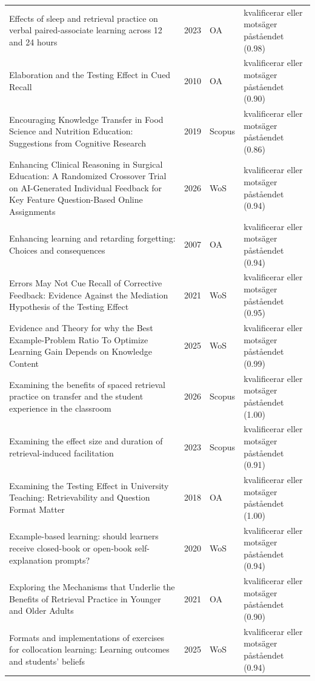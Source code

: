 \begin{longtable}{@{}%
  >{\raggedright\arraybackslash}p{}c%
  >{\raggedright\arraybackslash}p{}%
  >{\raggedright\arraybackslash}p{}@{}}
Effects of sleep and retrieval practice on verbal paired-associate learning across 12 and 24 hours & 2023 & OA & kvalificerar eller motsäger påståendet (0.98) \\
Elaboration and the Testing Effect in Cued Recall & 2010 & OA & kvalificerar eller motsäger påståendet (0.90) \\
Encouraging Knowledge Transfer in Food Science and Nutrition Education: Suggestions from Cognitive Research & 2019 & Scopus & kvalificerar eller motsäger påståendet (0.86) \\
Enhancing Clinical Reasoning in Surgical Education: A Randomized Crossover Trial on AI-Generated Individual Feedback for Key Feature Question-Based Online Assignments & 2026 & WoS & kvalificerar eller motsäger påståendet (0.94) \\
Enhancing learning and retarding forgetting: Choices and consequences & 2007 & OA & kvalificerar eller motsäger påståendet (0.94) \\
Errors May Not Cue Recall of Corrective Feedback: Evidence Against the Mediation Hypothesis of the Testing Effect & 2021 & WoS & kvalificerar eller motsäger påståendet (0.95) \\
Evidence and Theory for why the Best Example-Problem Ratio To Optimize Learning Gain Depends on Knowledge Content & 2025 & WoS & kvalificerar eller motsäger påståendet (0.99) \\
Examining the benefits of spaced retrieval practice on transfer and the student experience in the classroom & 2026 & Scopus & kvalificerar eller motsäger påståendet (1.00) \\
Examining the effect size and duration of retrieval-induced facilitation & 2023 & Scopus & kvalificerar eller motsäger påståendet (0.91) \\
Examining the Testing Effect in University Teaching: Retrievability and Question Format Matter & 2018 & OA & kvalificerar eller motsäger påståendet (1.00) \\
Example-based learning: should learners receive closed-book or open-book self-explanation prompts? & 2020 & WoS & kvalificerar eller motsäger påståendet (0.94) \\
Exploring the Mechanisms that Underlie the Benefits of Retrieval Practice in Younger and Older Adults & 2021 & OA & kvalificerar eller motsäger påståendet (0.90) \\
Formats and implementations of exercises for collocation learning: Learning outcomes and students' beliefs & 2025 & WoS & kvalificerar eller motsäger påståendet (0.94) \\

\end{longtable}
